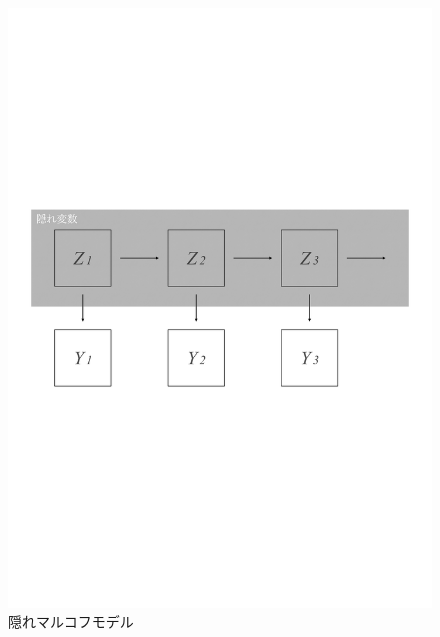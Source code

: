 \vspace{10mm}
\begin{figure}[htbp]
    \centering
    \includegraphics[width=1.0\textwidth]{figures/hiddenmarkov.pdf}
    \caption{隠れマルコフモデル}
    \label{fig:hiddenmarkov}
\end{figure}
\vspace{10mm}

